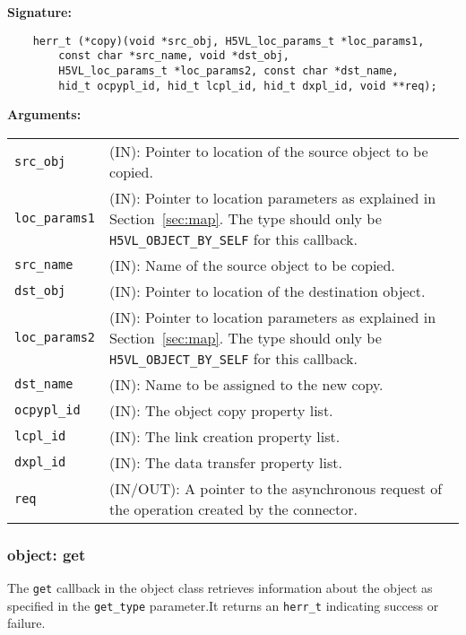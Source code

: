 \begin{mdframed}[style=bgbox]
\textbf{Signature:}
\begin{lstlisting}
    herr_t (*copy)(void *src_obj, H5VL_loc_params_t *loc_params1, 
        const char *src_name, void *dst_obj, 
        H5VL_loc_params_t *loc_params2, const char *dst_name,
        hid_t ocpypl_id, hid_t lcpl_id, hid_t dxpl_id, void **req);
\end{lstlisting}

\textbf{Arguments:}\\
\begin{tabular}{l p{13.5cm}}
  \texttt{src\_obj} & (IN): Pointer to location of the source object to
  be copied.\\
  \texttt{loc\_params1} & (IN): Pointer to location parameters as explained in
  Section~\ref{sec:map}. The type should only be \texttt{H5VL\_OBJECT\_BY\_SELF} for this callback.\\
  \texttt{src\_name} & (IN): Name of the source object to
  be copied.\\
  \texttt{dst\_obj} & (IN): Pointer to location of the destination
  object.\\
  \texttt{loc\_params2} & (IN): Pointer to location parameters as explained in
  Section~\ref{sec:map}. The type should only be \texttt{H5VL\_OBJECT\_BY\_SELF} for this callback.\\
  \texttt{dst\_name} & (IN): Name to be assigned to the new copy.\\
  \texttt{ocpypl\_id} & (IN): The object copy property list.\\
  \texttt{lcpl\_id} & (IN): The link creation property list.\\
  \texttt{dxpl\_id} & (IN): The data transfer property list.\\
  \texttt{req} & (IN/OUT): A pointer to the asynchronous request of the
  operation created by the connector.\\
\end{tabular}
\end{mdframed}

\subsubsection{object: get}
The \texttt{get} callback in the object class retrieves information
about the object as specified in the \texttt{get\_type} parameter.It
returns an \texttt{herr\_t} indicating success or failure.\bigskip

